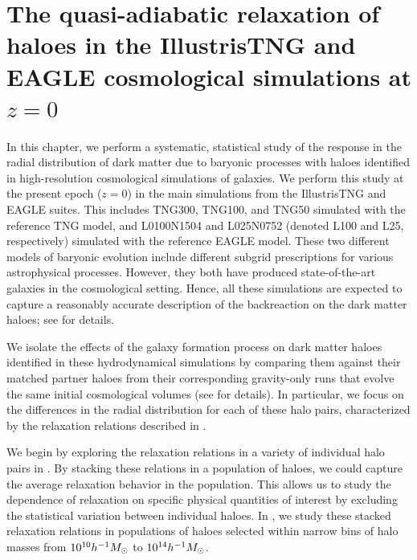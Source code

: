\chapter{The quasi-adiabatic relaxation of haloes in the IllustrisTNG and EAGLE cosmological simulations at $z=0$}
\label{chap:z0_main}

In this chapter, we perform a systematic, statistical study of the response in the radial distribution of dark matter due to baryonic processes with haloes identified in high-resolution cosmological simulations of galaxies. We perform this study at the present epoch (\(z=0\)) in the main simulations from the IllustrisTNG \citep[][]{2019ComAC...6....2N} and EAGLE \citep[][]{2017arXiv170609899T} suites. This includes TNG300, TNG100, and TNG50 simulated with the reference TNG model, and L0100N1504 and L025N0752 (denoted L100 and L25, respectively) simulated with the reference EAGLE model. These two different models of baryonic evolution include different subgrid prescriptions for various astrophysical processes. However, they both have produced state-of-the-art galaxies in the cosmological setting. Hence, all these simulations are expected to capture a reasonably accurate description of the backreaction on the dark matter haloes; see  for details.

We isolate the effects of the galaxy formation process on dark matter haloes identified in these hydrodynamical simulations by comparing them against their matched partner haloes from their corresponding gravity-only runs that evolve the same initial cosmological volumes (see  for details). In particular, we focus on the differences in the radial distribution for each of these halo pairs, characterized by the relaxation relations described in .

We begin by exploring the relaxation relations in a variety of individual halo pairs in . By stacking these relations in a population of haloes, we could capture the average relaxation behavior in the population. This allows us to study the dependence of relaxation on specific physical quantities of interest by excluding the statistical variation between individual haloes. In , we study these stacked relaxation relations in populations of haloes selected within narrow bins of halo masses from $10^{10} h^{-1}M_{\odot}$ to $10^{14} h^{-1}M_{\odot}$.

